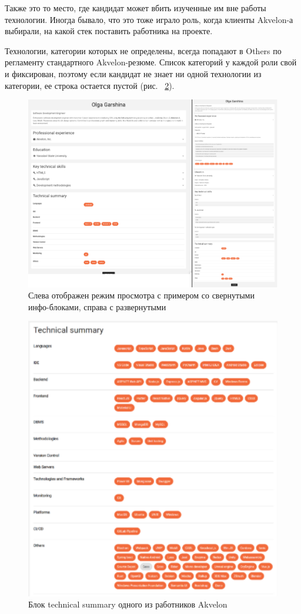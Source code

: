 \documentclass[a4paper,12pt]{diplom}
\begin{document}
Также это то место, где кандидат может вбить изученные им вне работы технологии. Иногда бывало, что это тоже играло роль, когда клиенты Akvelon-а выбирали, на какой стек поставить работника на проекте.

Технологии, категории которых не определены, всегда попадают в Others по регламенту стандартного Akvelon-резюме. Список категорий у каждой роли свой и фиксирован, поэтому если кандидат не знает ни одной технологии из категории, ее строка остается пустой (рис. ~\ref{14}).
\begin{figure}[!ht]
	\centering
	\includegraphics[width=1\textwidth]{resources/expand.png}
	\caption{Слева отображен режим просмотра с примером со свернутыми инфо-блоками, справа с развернутыми}
	\label{13}
\end{figure}
\begin{figure}[!ht]
	\centering
	\includegraphics[width=1\textwidth]{resources/tecsummary.png}
	\caption{Блок technical summary одного из работников Akvelon}
	\label{14}
\end{figure}
\end{document}
